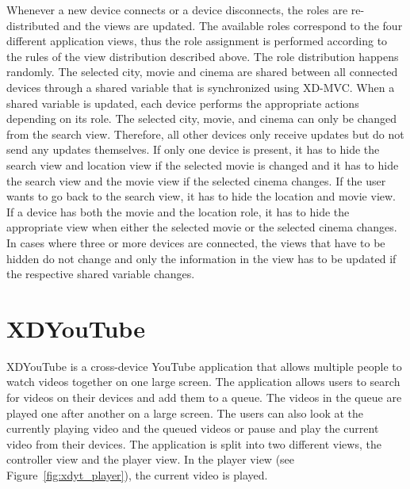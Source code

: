 Whenever a new device connects or a device disconnects, the roles are re-distributed and the views are updated. The available roles correspond to the four different application views, thus the role assignment is performed according to the rules of the view distribution described above. The role distribution happens randomly. The selected city, movie and cinema are shared between all connected devices through a shared variable that is synchronized using XD-MVC. When a shared variable is updated, each device performs the appropriate actions depending on its role. The selected city, movie, and cinema can only be changed from the search view. Therefore, all other devices only receive updates but do not send any updates themselves. If only one device is present, it has to hide the search view and location view if the selected movie is changed and it has to hide the search view and the movie view if the selected cinema changes. If the user wants to go back to the search view, it has to hide the location and movie view. If a device has both the movie and the location role, it has to hide the appropriate view when either the selected movie or the selected cinema changes. In cases where three or more devices are connected, the views that have to be hidden do not change and only the information in the view has to be updated if the respective shared variable changes. 

\section{XDYouTube}

XDYouTube is a cross-device YouTube application that allows multiple people to watch videos together on one large screen. The application allows users to search for videos on their devices and add them to a queue. The videos in the queue are played one after another on a large screen. The users can also look at the currently playing video and the queued videos or pause and play the current video from their devices. The application is split into two different views, the controller view and the player view. In the player view (see Figure~\ref{fig:xdyt_player}), the current video is played. 

